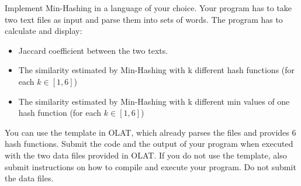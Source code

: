 Implement Min-Hashing in a language of your choice.
Your program has to take two text files as input and parse them into sets of words.
The program has to calculate and display:
\begin{itemize}
\item Jaccard coefficient between the two texts.
\item The similarity estimated by Min-Hashing with k different hash functions (for each $k \in [1,6]$)
\item The similarity estimated by Min-Hashing with k different min values of one hash function (for each $k \in [1,6]$)
\end{itemize}

You can use the template in OLAT, which already parses the files and provides 6 hash functions.
Submit the code and the output of your program when executed with the two data files provided in OLAT.
If you do not use the template, also submit instructions on how to compile and execute your program.
Do not submit the data files.


